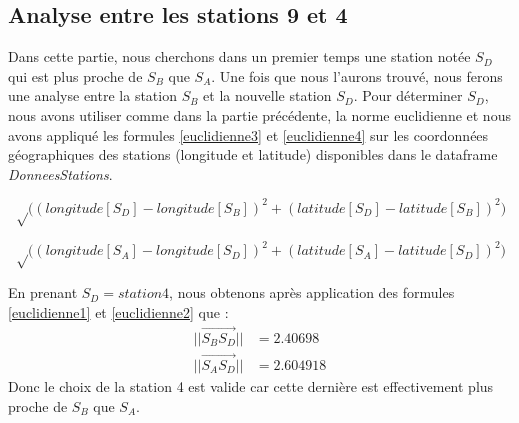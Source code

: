 \documentclass[a4paper,french,10pt]{article}
\begin{document}
\subsection{Analyse entre les stations 9 et 4}
Dans cette partie, nous cherchons dans un premier temps une station notée $S_D$ qui est plus proche de $S_B$ que $S_A$. Une fois que nous l'aurons trouvé, nous ferons une analyse entre la station $S_B$ et la nouvelle station $S_D$.
Pour déterminer $S_D$, nous avons utiliser comme dans la partie précédente, la norme euclidienne et nous avons appliqué les formules \ref{euclidienne3} et \ref{euclidienne4} sur les coordonnées géographiques des stations (longitude et latitude) disponibles dans le dataframe \textit{DonneesStations}.

\begin{equation}
	\label{euclidienne3}
	\sqrt \Big(  (longitude[S_D] - longitude[S_B])^2 + (latitude[S_D] - latitude[S_B])^2 \Big)
\end{equation}

\begin{equation}
	\label{euclidienne4}
	\sqrt \Big(  (longitude[S_A] - longitude[S_D])^2 + (latitude[S_A] - latitude[S_D])^2 \Big)
\end{equation}

En prenant $S_D = station4$, nous obtenons après application des formules \ref{euclidienne1} et \ref{euclidienne2} que :
\begin{align*}
	|| \overrightarrow{S_B S_D} || &=  2.40698 \\
	|| \overrightarrow{S_A S_D} || &=  2.604918
\end{align*}
Donc le choix de la station 4 est valide car cette dernière est effectivement plus proche de $S_B$ que $S_A$.

\vspace{3mm}
\end{document}
